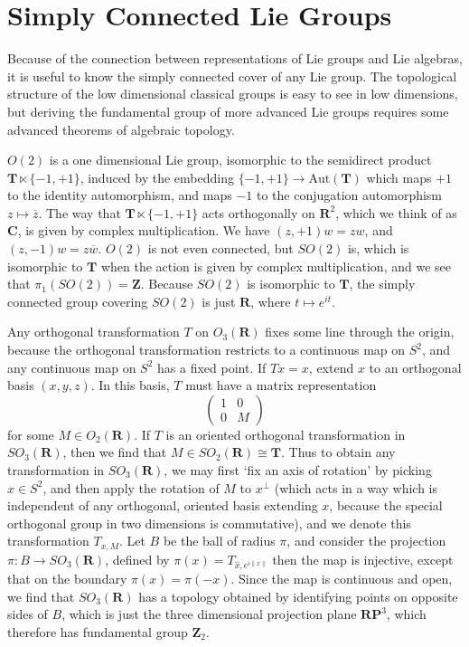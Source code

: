\section{Simply Connected Lie Groups}

Because of the connection between representations of Lie groups and Lie algebras, it is useful to know the simply connected cover of any Lie group. The topological structure of the low dimensional classical groups is easy to see in low dimensions, but deriving the fundamental group of more advanced Lie groups requires some advanced theorems of algebraic topology.

\begin{example}
    $O(2)$ is a one dimensional Lie group, isomorphic to the semidirect product $\mathbf{T} \ltimes \{ -1, +1 \}$, induced by the embedding $\{ -1, +1 \} \to \text{Aut}(\mathbf{T})$ which maps $+1$ to the identity automorphism, and maps $-1$ to the conjugation automorphism $z \mapsto \overline{z}$. The way that $\mathbf{T} \ltimes \{ -1, +1 \}$ acts orthogonally on $\mathbf{R}^2$, which we think of as $\mathbf{C}$, is given by complex multiplication. We have $(z,+1)w = zw$, and $(z,-1)w = z\overline{w}$. $O(2)$ is not even connected, but $SO(2)$ is, which is isomorphic to $\mathbf{T}$ when the action is given by complex multiplication, and we see that $\pi_1(SO(2)) = \mathbf{Z}$. Because $SO(2)$ is isomorphic to $\mathbf{T}$, the simply connected group covering $SO(2)$ is just $\mathbf{R}$, where $t \mapsto e^{it}$.
\end{example}

\begin{example}
    Any orthogonal transformation $T$ on $O_3(\mathbf{R})$ fixes some line through the origin, because the orthogonal transformation restricts to a continuous map on $S^2$, and any continuous map on $S^2$ has a fixed point. If $Tx = x$, extend $x$ to an orthogonal basis $(x,y,z)$. In this basis, $T$ must have a matrix representation
    \[ \begin{pmatrix} 1 & 0 \\ 0 & M \end{pmatrix} \]
    for some $M \in O_2(\mathbf{R})$. If $T$ is an oriented orthogonal transformation in $SO_3(\mathbf{R})$, then we find that $M \in SO_2(\mathbf{R}) \cong \mathbf{T}$. Thus to obtain any transformation in $SO_3(\mathbf{R})$, we may first `fix an axis of rotation' by picking $x \in S^2$, and then apply the rotation of $M$ to $x^\perp$ (which acts in a way which is independent of any orthogonal, oriented basis extending $x$, because the special orthogonal group in two dimensions is commutative), and we denote this transformation $T_{x,M}$. Let $B$ be the ball of radius $\pi$, and consider the projection $\pi: B \to SO_3(\mathbf{R})$, defined by $\pi(x) = T_{\hat{x},e^{i \| x \|}}$ then the map is injective, except that on the boundary $\pi(x) = \pi(-x)$. Since the map is continuous and open, we find that $SO_3(\mathbf{R})$ has a topology obtained by identifying points on opposite sides of $B$, which is just the three dimensional projection plane $\mathbf{RP}^3$, which therefore has fundamental group $\mathbf{Z}_2$.
\end{example}


